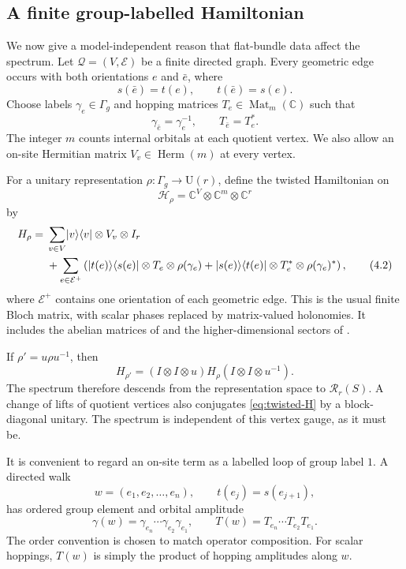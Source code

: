 \documentclass[11pt]{article}
\theoremstyle{definition}
\theoremstyle{remark}
\newcommand{\CC}{\mathbb C}
\newcommand{\UU}{\mathrm U}
\newcommand{\cR}{\mathcal R}
\newcommand{\cH}{\mathcal H}
\newcommand{\cE}{\mathcal E}
\newcommand{\ket}[1]{\lvert #1\rangle}
\newcommand{\bra}[1]{\langle #1\rvert}
\begin{document}
\subsection{A finite group-labelled Hamiltonian}

We now give a model-independent reason that flat-bundle data affect the
spectrum.  Let \(\mathcal Q=(V,\cE)\) be a finite directed graph.  Every
geometric edge
occurs with both orientations \(e\) and \(\bar e\), where
\[
 s(\bar e)=t(e),\qquad t(\bar e)=s(e).
\]
Choose labels \(\gamma_e\in\Gamma_g\) and hopping matrices
\(T_e\in\operatorname{Mat}_m(\CC)\) such that
\[
              \gamma_{\bar e}=\gamma_e^{-1},
              \qquad T_{\bar e}=T_e^*.
              \tag{4.1}\label{eq:reverse-edge}
\]
The integer \(m\) counts internal orbitals at each quotient vertex.  We also
allow an on-site Hermitian matrix \(V_v\in\operatorname{Herm}(m)\) at every
vertex.

For a unitary representation \(\rho:\Gamma_g\to\UU(r)\), define the twisted
Hamiltonian on
\[
       \cH_\rho=\CC^V\otimes\CC^m\otimes\CC^r
\]
by
\begin{align}
H_\rho
  ={}&\sum_{v\in V}\ket v\bra v\otimes V_v\otimes I_r \notag\\
   &+\sum_{e\in\cE^+}
      \left(
       \ket{t(e)}\bra{s(e)}\otimes T_e\otimes\rho(\gamma_e)
       +
       \ket{s(e)}\bra{t(e)}\otimes T_e^*\otimes\rho(\gamma_e)^*
      \right),
      \tag{4.2}\label{eq:twisted-H}
\end{align}
where \(\cE^+\) contains one orientation of each geometric edge.  This is the
usual finite Bloch matrix, with scalar phases replaced by matrix-valued
holonomies.  It includes the abelian matrices of
\cite{MaciejkoRayan2021,BoettcherEtAl2022} and the higher-dimensional sectors
of \cite{MaciejkoRayan2022,LenggenhagerEtAl2023}.

If \(\rho'=u\rho u^{-1}\), then
\[
 H_{\rho'}=(I\otimes I\otimes u)H_\rho(I\otimes I\otimes u^{-1}).
 \tag{4.3}\label{eq:rho-conjugacy}
\]
The spectrum therefore descends from the representation space to
\(\cR_r(S)\).  A change of lifts of quotient vertices also conjugates
\eqref{eq:twisted-H} by a block-diagonal unitary.  The spectrum is independent
of this vertex gauge, as it must be.

It is convenient to regard an on-site term as a labelled loop of group label
\(1\).  A directed walk
\[
             w=(e_1,e_2,\ldots,e_n),
             \qquad t(e_j)=s(e_{j+1}),
\]
has ordered group element and orbital amplitude
\[
   \gamma(w)=\gamma_{e_n}\cdots\gamma_{e_2}\gamma_{e_1},
   \qquad
   T(w)=T_{e_n}\cdots T_{e_2}T_{e_1}.
   \tag{4.4}\label{eq:walk-data}
\]
The order convention is chosen to match operator composition.  For scalar
hoppings, \(T(w)\) is simply the product of hopping amplitudes along \(w\).
\end{document}
